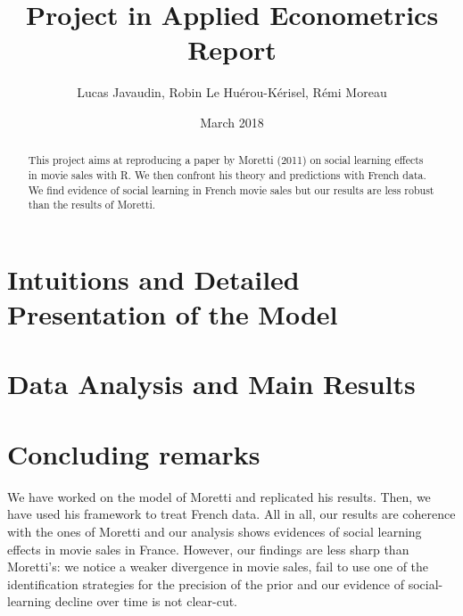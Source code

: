 \documentclass{article}
\title{Project in Applied Econometrics\\ Report}
\author{Lucas Javaudin, Robin Le Huérou-Kérisel, Rémi Moreau}
\date{March 2018}
\begin{document}
\maketitle

%
%
%
%
%
\begin{abstract}
	This project aims at reproducing a paper by Moretti (2011) on social learning effects in movie sales with R. We then confront his theory and predictions with French data. We find evidence of social learning in French movie sales but our results are less robust than the results of Moretti.
\end{abstract}
\tableofcontents
\pagebreak
\section{Intuitions and Detailed Presentation of the Model}


\pagebreak
\section{Data Analysis and Main Results}






\section{Concluding remarks}


We have worked on the model of Moretti and replicated his results. Then, we have used his framework to treat French data. All in all, our results are coherence with the ones of Moretti and our analysis shows evidences of social learning effects in movie sales in France. However, our findings are less sharp than Moretti's: we notice a weaker divergence in movie sales, fail to use one of the identification strategies for the precision of the prior and our evidence of social-learning decline over time is not clear-cut. 
\end{document}
